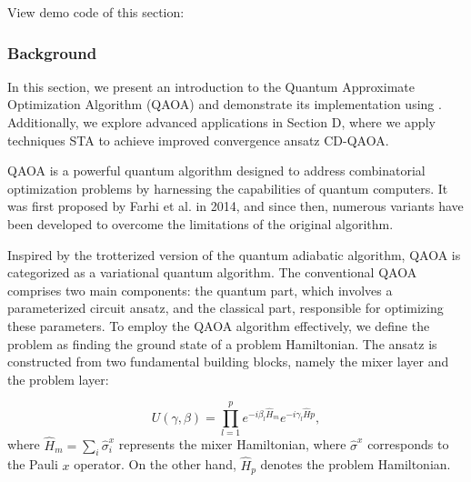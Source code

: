 


View demo code of this section: 

\subsubsection{Background}

In this section, we present an introduction to the Quantum Approximate Optimization Algorithm (QAOA) and demonstrate its implementation using \MindQuantum. Additionally, we explore advanced applications in Section D, where we apply techniques STA to achieve improved convergence ansatz CD-QAOA\cite{PhysRevResearch.4.013141}.


QAOA is a powerful quantum algorithm designed to address combinatorial optimization problems by harnessing the capabilities of quantum computers. It was first proposed by Farhi et al. in 2014\cite{farhi2014quantum}, and since then, numerous variants have been developed to overcome the limitations of the original algorithm.

Inspired by the trotterized version of the quantum adiabatic algorithm, QAOA is categorized as a variational quantum algorithm. The conventional QAOA comprises two main components: the quantum part, which involves a parameterized circuit ansatz, and the classical part, responsible for optimizing these parameters. To employ the QAOA algorithm effectively, we define the problem as finding the ground state of a problem Hamiltonian. The ansatz is constructed from two fundamental building blocks, namely the mixer layer and the problem layer:

\begin{equation}
    U(\gamma, \beta) = \prod_{l=1}^p e^{-i\beta_l \hat{H}_{m}}e^{-i\gamma_l\hat{H}{{p}}},
\end{equation}
where $\hat{H}_{{m}} = \sum_i \hat{\sigma}^x_i$ represents the mixer Hamiltonian, where $\hat{\sigma}^x$ corresponds to the Pauli $x$ operator. On the other hand, $\hat{H}_{{p}}$ denotes the problem Hamiltonian.

